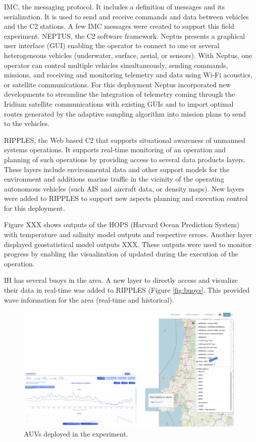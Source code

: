 IMC, the messaging protocol. It includes a definition of messages and
its serialization. It is used to send and receive commands and data
between vehicles and the C2 stations. A few IMC messages were created to
support this field experiment. NEPTUS, the C2 software framework. Neptus
presents a graphical user interface (GUI) enabling the operator to
connect to one or several heterogeneous vehicles (underwater, surface,
aerial, or sensors). With Neptus, one operator can control multiple
vehicles simultaneously, sending commands, missions, and receiving and
monitoring telemetry and data using Wi-Fi acoustics, or satellite
communications. For this deployment Neptus incorporated new developments
to streamline the integration of telemetry coming through the Iridium
satellite communications with existing GUIs and to import optimal routes
generated by the adaptive sampling algorithm into mission plans to send
to the vehicles.

RIPPLES, the Web based C2 that supports situational awareness of
unmanned systems operations. It supports real-time monitoring of an
operation and planning of such operations by providing access to several
data products layers. These layers include environmental data and other
support models for the environment and additions marine traffic in the
vicinity of the operating autonomous vehicles (such AIS and aircraft
data, or density maps). New layers were added to RIPPLES to support new
aspects planning and execution control for this deployment.

Figure XXX shows outputs of the HOPS (Harvard Ocean Prediction System)
with temperature and salinity model outputs and respective errors.
Another layer displayed geostatistical model outputs XXX. These outputs
were used to monitor progress by enabling the visualization of updated
during the execution of the operation.

IH has several buoys in the area. A new layer to directly access and
visualize their data in real-time was added to RIPPLES (Figure
\ref{fig:buoys}. This provided wave information for the area (real-time
and historical).


\begin{figure}
    \centering
    \includegraphics[width=.7\linewidth]{fig/buoys.png}
    \caption{AUVs deployed in the experiment.}
    \label{fibuoys}
\end{figure}

